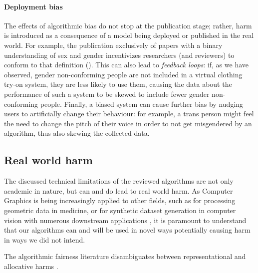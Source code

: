 \documentclass[nonacm,sigconf,review,balance=false]{acmart}
\begin{document}




\paragraph*{Deployment bias} The effects of algorithmic bias do not stop at the publication stage; rather, harm is introduced as a consequence of a model being deployed or published in the real world. For example, the publication exclusively of papers with a binary understanding of sex and gender incentivizes researchers (and reviewers) to conform to that definition (\binary).
This can also lead to \emph{feedback loops}: if, as we have observed, gender non-conforming people are not included in a virtual clothing try-on system, they are less likely to use them, causing the data about the performance of such a system to be skewed to include fewer gender non-conforming people. Finally, a biased system can cause further bias by nudging users to artificially change their behaviour: for example, a trans person might feel the need to change the pitch of their voice in order to not get misgendered by an algorithm, thus also skewing the collected data.

\vspace{-0.1cm}
\subsection{Real world harm}

The discussed technical limitations of the reviewed algorithms are not only academic in nature, but can and do lead to real world harm. As Computer Graphics is being increasingly applied to other fields, such as for processing geometric data in medicine, or for synthetic dataset generation in computer vision with numerous downstream applications \cite{cars, chen2021synthetic, dhs}, it is paramount to understand that our algorithms can and will be used in novel ways potentially causing harm in ways we did not intend.

The algorithmic fairness literature disambiguates between representational and allocative harms \cite{barocas-hardt-narayanan}.
\end{document}
